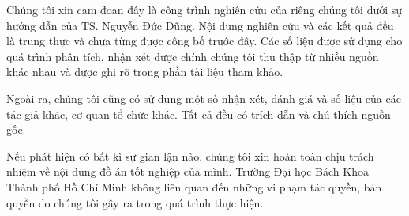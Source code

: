 \begin{declaration}
    Chúng tôi xin cam đoan đây là công trình nghiên cứu của riêng chúng tôi dưới sự hướng dẫn của TS. Nguyễn Đức Dũng. Nội dung nghiên cứu và các kết quả đều là trung thực và chưa từng được công bố trước đây. Các số liệu được sử dụng cho quá trình phân tích, nhận xét được chính chúng tôi thu thập từ nhiều nguồn khác nhau và được ghi rõ trong phần tài liệu tham khảo.

    Ngoài ra, chúng tôi cũng có sử dụng một số nhận xét, đánh giá và số liệu của các tác giả khác, cơ quan tổ chức khác. Tất cả đều có trích dẫn và chú thích nguồn gốc.

    Nếu phát hiện có bất kì sự gian lận nào, chúng tôi xin hoàn toàn chịu trách nhiệm về nội dung đồ án tốt nghiệp của mình. Trường Đại học Bách Khoa Thành phố Hồ Chí Minh không liên quan đến những vi phạm tác quyền, bản quyền do chúng tôi gây ra trong quá trình thực hiện.

\end{declaration}